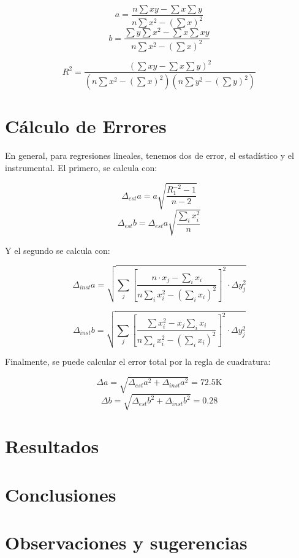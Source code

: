 \documentclass[a4paper,12pt]{article}
\begin{document}
\begin{equation}
  a = \frac{n\sum x y - \sum x \sum y}{n \sum x^2 - \left(\sum x\right)^2}
\end{equation}
\begin{equation}
  b = \frac{\sum y \sum x^2 - \sum x \sum x y}{n\sum x^2 - \left(\sum x \right)^2}
\end{equation}

\begin{equation}
R^2=\frac{\left(\sum x y -\sum x \sum y\right)^2}{\left(n\sum x^2 - \left(\sum x\right)^2\right)\left(n\sum y^2 - \left(\sum y\right)^2\right)} 
  
\end{equation}
\section{Cálculo de Errores}

En general, para regresiones lineales, tenemos dos de error, el estadístico y el instrumental. El primero, se calcula con:

$$\Delta_{est} a= a\sqrt{\frac{R_1^{-2}-1}{n-2}}$$ 
$$\Delta_{est} b = \Delta_{est} a\sqrt{\frac{\sum_i x_i^2}{n}}$$

Y el segundo se calcula con:

  $$\Delta_{inst} a = \sqrt{\sum_j\left[ \frac{n\cdot x_j - \sum_ix_i}{n\sum_i x_i^2-\left(  \sum_i  x_i\right)^2} \right]^2 \cdot \Delta y_j^2}$$ 

  $$\Delta_{inst} b =\sqrt{\sum_j\left[ \frac{\sum x_i^2 -x_j \sum_i x_i}{n\sum_i x_i^2-\left(  \sum_i  x_i\right)^2} \right]^2 \cdot \Delta y_j^2}$$

Finalmente, se puede calcular el error total por la regla de cuadratura:

\begin{equation}
  \Delta a = \sqrt{\Delta_{est} a^2 + \Delta_{inst} a^2} = 72.5\text{K}
\end{equation}
\begin{equation}
  \Delta b = \sqrt{\Delta_{est} b^2 + \Delta_{inst} b^2} = 0.28
\end{equation}
\section{Resultados}
\begin{tcolorbox}
  
\end{tcolorbox}
\section{Conclusiones}

\section{Observaciones y sugerencias}


\printbibliography
\end{document}

